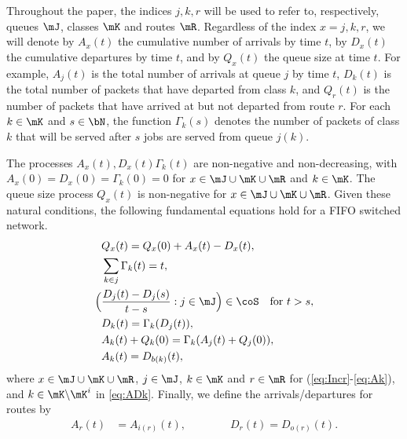 \documentclass{amsart}
\begin{document}
Throughout the paper, the indices $j, k,r$ will be used to refer to, respectively, queues $\mJ$, classes $\mK$ and routes $\mR$. Regardless of the index $x=j,k,r$, we will denote by $A_x(t)$ the cumulative number of arrivals by time $t$, by $D_x(t)$ the cumulative departures by time $t$, and by $Q_x(t)$ the queue size at time $t$.
For example, $A_j(t)$ is the total number of arrivals at queue $j$ by time $t$, $D_k(t)$ is the total number of packets that have departed from class $k$, and $Q_r(t)$ is the number of packets that have arrived at but not departed from route $r$.
For each  $k\in\mK$ and $s\in\bN$, the function $\Gamma_k(s)$ denotes the number of packets of class $k$ that will be served after $s$ jobs are served from queue $j(k)$.

The processes $A_x(t), D_x(t)$$\Gamma_k(t)$ are non-negative and non-decreasing, with $A_x(0) = D_x(0)=\Gamma_k(0) =0$ for $x\in \mJ\cup \mK\cup \mR$ and $k\in\mK$.  The queue size process $Q_x(t)$ is non-negative for $x\in \mJ\cup \mK\cup \mR$. Given these natural conditions, the following fundamental equations hold for a FIFO switched network.
\begin{align}
& Q_x(t) = Q_x(0)+ A_x(t) - D_x(t), \label{eq:Incr}\\
 
&\sum_{k \in j} \Gamma_k(t) = t, \label{eq:gammak} \\
\Big( &\frac{D_j(t) -D_j(s)}{t-s} : {j\in\mJ}\Big) \in \coS   \label{eq:Dcov} \quad \text{for } t>s, \\
&D_k(t) = \Gamma_k(D_j(t)), \label{eq:Dk}\\%
&A_k(t) + Q_k(0) = \Gamma_k(A_j(t) + Q_j(0)), \label{eq:Ak}\\ &A_k(t) = D_{b(k)}(t), \label{eq:ADk}
\end{align}
where $x\in \mJ\cup \mK\cup \mR$, $j\in\mJ$, $k\in\mK$ and $r\in\mR$ for (\ref{eq:Incr}-\ref{eq:Ak}), and $k\in\mK \backslash \mK^i$ in \eqref{eq:ADk}.
Finally, we define the arrivals/departures for routes by 
\begin{align}\label{eq:ADr}
A_r(t) &= A_{i(r)}(t), \qquad\qquad D_r(t) = D_{o(r)}(t).
\end{align}
\end{document}
